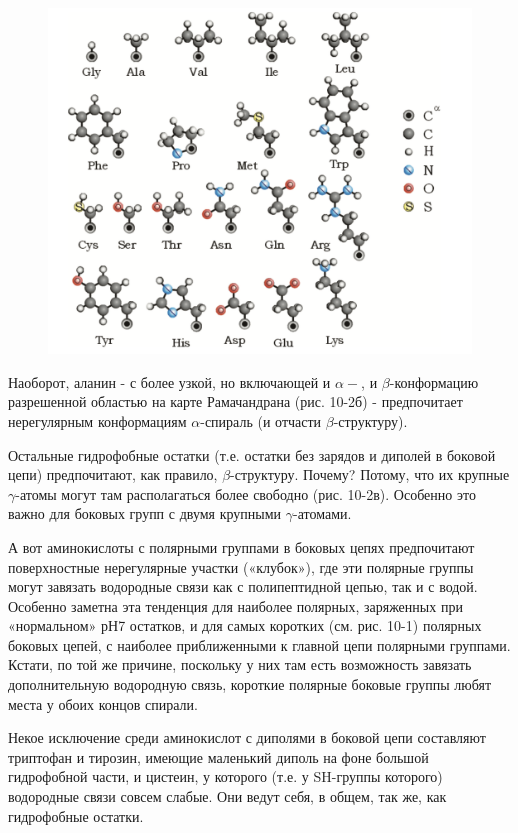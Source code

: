 \documentclass[
11pt,%
tightenlines,%
twoside,%
onecolumn,%
nofloats,%
nobibnotes,%
nofootinbib,%
superscriptaddress,%
noshowpacs,%
centertags]%
{revtex4}
\begin{document}
\begin{figure}
	\centering
	\includegraphics[scale=0.3]{amin}
	\caption{}
\end{figure}
Наоборот, аланин - с более узкой, но включающей и $\alpha-$, и $\beta$-конформацию разрешенной областью на карте Рамачандрана (рис. 10-2б) - предпочитает нерегулярным конформациям $\alpha$-спираль (и отчасти $\beta$-структуру).

Остальные гидрофобные остатки (т.е. остатки без зарядов и диполей в боковой цепи) предпочитают, как правило, $\beta$-структуру. Почему? Потому, что их крупные $\gamma$-атомы могут там располагаться более свободно (рис. 10-2в). Особенно это важно для боковых групп с двумя крупными $\gamma$-атомами.

А вот аминокислоты с полярными группами в боковых цепях предпочитают поверхностные нерегулярные участки («клубок»), где эти полярные группы могут завязать водородные связи как с полипептидной цепью, так и с водой. Особенно заметна эта тенденция для наиболее полярных, заряженных при «нормальном» рН7 остатков, и для самых коротких (см. рис. 10-1) полярных боковых цепей, с наиболее приближенными к главной цепи полярными группами. Кстати, по той же причине, поскольку у них там есть возможность завязать дополнительную водородную связь, короткие полярные боковые группы любят места у обоих концов спирали.

Некое исключение среди аминокислот с диполями в боковой цепи составляют триптофан и тирозин, имеющие маленький диполь на фоне большой гидрофобной части, и цистеин, у которого (т.е. у SH-группы которого) водородные связи совсем слабые. Они ведут себя, в общем, так же, как гидрофобные остатки.
\end{document}
